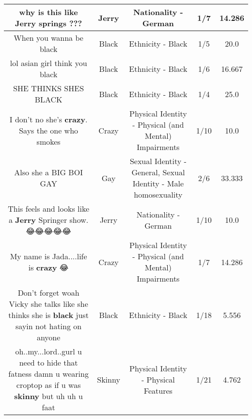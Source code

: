 \documentclass[11pt]{article}
\newlength\mylength
\begin{document}
\begin{center}
\begin{longtable}{|C{.65\mylength}|C{.30\mylength}|C{.12\mylength}|C{.12\mylength}|C{.12\mylength}|}
  \small why is this like \textbf{Jerry} springs ???\normalsize   & Jerry & Nationality - German & 1/7 & 14.286 \\  \hline
  \small When you wanna be black\normalsize   & Black & Ethnicity - Black & 1/5 & 20.0 \\  \hline
  \small lol asian girl think you black\normalsize   & Black & Ethnicity - Black & 1/6 & 16.667 \\  \hline
  \small SHE THINKS SHES BLACK\normalsize   & Black & Ethnicity - Black & 1/4 & 25.0 \\  \hline
  \small I don't no she's \textbf{crazy}. Says the one who smokes\normalsize   & Crazy & Physical Identity - Physical (and Mental) Impairments & 1/10 & 10.0 \\  \hline
  \small Also she a BIG BOI GAY\normalsize   & Gay & Sexual Identity - General, Sexual Identity - Male homosexuality & 2/6 & 33.333 \\  \hline
  \small This feels and looks like a \textbf{Jerry} Springer show.  😂😂😂😂😂\normalsize   & Jerry & Nationality - German & 1/10 & 10.0 \\  \hline
  \small My name is Jada....life is \textbf{crazy} 😂\normalsize   & Crazy & Physical Identity - Physical (and Mental) Impairments & 1/7 & 14.286 \\  \hline
  \small Don't forget woah Vicky she talks like she thinks she is \textbf{black} just sayin not hating on anyone\normalsize   & Black & Ethnicity - Black & 1/18 & 5.556 \\  \hline
  \small oh..my...lord..gurl u need to hide that fatness damn u wearing croptop as if u was \textbf{skinny} but uh uh u faat\normalsize   & Skinny & Physical Identity - Physical Features & 1/21 & 4.762 \\  \hline

\end{longtable}
\end{center}
\end{document}
